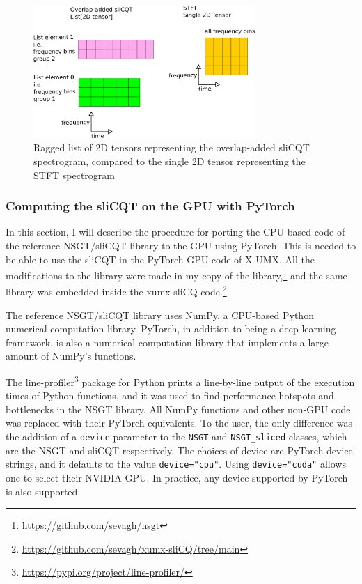 \documentclass[report.tex]{subfiles}
\begin{document}
\begin{figure}[ht]
	\centering
	\includegraphics[width=0.75\textwidth]{./images-blockdiagrams/2dslicqolastft.png}
	\caption{Ragged list of 2D tensors representing the overlap-added sliCQT spectrogram, compared to the single 2D tensor representing the STFT spectrogram}
	\label{fig:2dslicqolastft}
\end{figure}

\subsubsection{Computing the sliCQT on the GPU with PyTorch}
\label{sec:torchslicq}

In this section, I will describe the procedure for porting the CPU-based code of the reference NSGT/sliCQT library to the GPU using PyTorch. This is needed to be able to use the sliCQT in the PyTorch GPU code of X-UMX. All the modifications to the library were made in my copy of the library,\footnote{\url{https://github.com/sevagh/nsgt}} and the same library was embedded inside the xumx-sliCQ code.\footnote{\url{https://github.com/sevagh/xumx-sliCQ/tree/main}}

The reference NSGT/sliCQT library uses NumPy, a CPU-based Python numerical computation library. PyTorch, in addition to being a deep learning framework, is also a numerical computation library that implements a large amount of NumPy's functions.

The line-profiler\footnote{\url{https://pypi.org/project/line-profiler/}} package for Python prints a line-by-line output of the execution times of Python functions, and it was used to find performance hotspots and bottlenecks in the NSGT library. All NumPy functions and other non-GPU code was replaced with their PyTorch equivalents. To the user, the only difference was the addition of a \Verb#device# parameter to the \Verb#NSGT# and \Verb#NSGT_sliced# classes, which are the NSGT and sliCQT respectively. The choices of device are PyTorch device strings, and it defaults to the value \Verb#device="cpu"#. Using \Verb#device="cuda"# allows one to select their NVIDIA GPU. In practice, any device supported by PyTorch is also supported.
\end{document}
